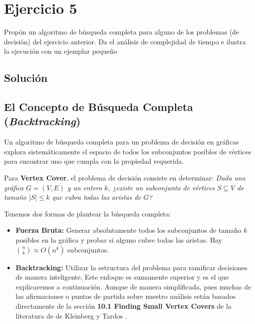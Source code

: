 \section{Ejercicio 5}

\begin{tcolorbox}[enunciado]
Propón un algoritmo de búsqueda completa para alguno de los problemas (de decisión) del ejercicio anterior. Da el análisis de complejidad de tiempo e ilustra la ejecución con un ejemplar pequeño
\end{tcolorbox}

\subsection{Solución}

\subsection*{El Concepto de Búsqueda Completa (\textit{Backtracking})}

Un algoritmo de búsqueda completa para un problema de decisión en gráficas explora sistemáticamente el espacio de todos los subconjuntos posibles de vértices para encontrar uno que cumpla con la propiedad requerida. 

Para \textbf{Vertex Cover}, el problema de decisión consiste en determinar: \textit{Dada una gráfica $G = (V, E)$ y un entero $k$, ¿existe un subconjunto de vértices $S \subseteq V$ de tamaño $|S| \le k$ que cubra todas las aristas de $G$?}

Tenemos dos formas de plantear la búsqueda completa:

\begin{itemize}
    \item \textbf{Fuerza Bruta:} Generar absolutamente todos los subconjuntos de tamaño $k$ posibles en la gráfica y probar si alguno cubre todas las aristas. Hay $\binom{n}{k} \approx O(n^k)$ subconjuntos.
    \item \textbf{Backtracking:} Utilizar la estructura del problema para ramificar decisiones de manera inteligente. Este enfoque es sumamente superior y es el que explicaremos a continuación. Aunque de manera simplificada, pues muchas de las afirmaciones o puntos de partida sobre nuestro análisis están basados directamente de la sección \textbf{10.1 Finding Small Vertex Covers} de la literatura de de Kleinberg y Tardos \cite{kleinberg2005}.
\end{itemize}

